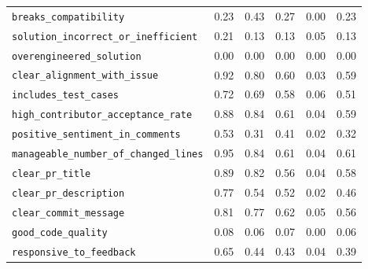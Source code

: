 \begin{table}[!htbp]
\begin{tabular}{lccccc}
\texttt{breaks\_compatibility} & 0.23 & 0.43 & 0.27 & 0.00 & 0.23 \\
\texttt{solution\_incorrect\_or\_inefficient} & 0.21 & 0.13 & 0.13 & 0.05 & 0.13 \\
\texttt{overengineered\_solution} & 0.00 & 0.00 & 0.00 & 0.00 & 0.00 \\
\texttt{clear\_alignment\_with\_issue} & 0.92 & 0.80 & 0.60 & 0.03 & 0.59 \\
\texttt{includes\_test\_cases} & 0.72 & 0.69 & 0.58 & 0.06 & 0.51 \\
\texttt{high\_contributor\_acceptance\_rate} & 0.88 & 0.84 & 0.61 & 0.04 & 0.59 \\
\texttt{positive\_sentiment\_in\_comments} & 0.53 & 0.31 & 0.41 & 0.02 & 0.32 \\
\texttt{manageable\_number\_of\_changed\_lines} & 0.95 & 0.84 & 0.61 & 0.04 & 0.61 \\
\texttt{clear\_pr\_title} & 0.89 & 0.82 & 0.56 & 0.04 & 0.58 \\
\texttt{clear\_pr\_description} & 0.77 & 0.54 & 0.52 & 0.02 & 0.46 \\
\texttt{clear\_commit\_message} & 0.81 & 0.77 & 0.62 & 0.05 & 0.56 \\
\texttt{good\_code\_quality} & 0.08 & 0.06 & 0.07 & 0.00 & 0.06 \\
\texttt{responsive\_to\_feedback} & 0.65 & 0.44 & 0.43 & 0.04 & 0.39 \\
\bottomrule
\end{tabular}
\end{table}


\FloatBarrier
